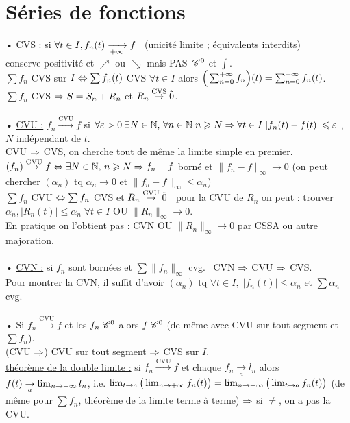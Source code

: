 \documentclass[12 pt]{book}
\begin{document}
\section*{Séries de fonctions}
• \underline{CVS :} si $\forall t\in I, f_n(t)\xrightarrow[+\infty]{} f$ \ (unicité limite ; équivalents interdits)\\
conserve positivité et $\nearrow$ ou $\searrow$ mais PAS $\, \mathscr{C}^0$ et $\int$.\\
$\sum f_n$ CVS sur $I \Leftrightarrow \sum f_n(t)$ CVS $\forall t\in I$ alors $\Big(\sum_{n=0}^{+\infty} f_n \Big)(t) = \sum_{n=0}^{+\infty} f_n(t)$.\\
$\sum f_n$ CVS $\Rightarrow S= S_n + R_n$ et $R_n \overset{\text{CVS}}{\to} \Tilde{0}$.\\
\text{}\\
• \underline{CVU :} $f_n \overset{\text{CVU}}{\to} f$ si $\forall\varepsilon>0 \; \exists N\in \mathbb{N},\, \forall n \in \mathbb{N} \; n\geqslant N \Rightarrow \forall t\in I\; |f_n(t)-f(t)|\leqslant\varepsilon$ , $N$ indépendant de $t$.\\
CVU $\Rightarrow$ CVS, on cherche tout de même la limite simple en premier.\\
$(f_n)\overset{\text{CVU}}{\to} f \Leftrightarrow \exists N\in\mathbb{N}, \, n\geqslant N \Rightarrow f_n -f$ borné et $\| f_n -f\|_\infty \to 0$ (on peut chercher $(\alpha_n)$ tq $\alpha_n \to 0$ et $\|f_n-f\|_\infty \leqslant\alpha_n$)\\
$\sum f_n$ CVU $\Leftrightarrow \sum f_n$ CVS et $R_n \overset{\text{CVU}}{\rightarrow}\Tilde{0}$ \ pour la CVU de $R_n$ on peut : trouver $\alpha_n, |R_n(t)|\leqslant \alpha_n \; \forall t\in I$ OU $\|R_n\|_\infty \to 0$.\\
En pratique on l'obtient pas : CVN OU $\|R_n\|_\infty \to 0$ par CSSA ou autre majoration.\\
\text{}\\
• \underline{CVN :} si $f_n$ sont bornées et $\sum \| f_n\|_\infty$ cvg. \ CVN $\Rightarrow$ CVU $\Rightarrow$ CVS.\\
Pour montrer la CVN, il suffit d'avoir $(\alpha_n)$ tq $\forall t\in I, \; |f_n(t)|\leqslant \alpha_n$ et $\sum\alpha_n$ cvg.\\
\text{}\\
• Si $f_n\overset{\text{CVU}}{\to}f$ et les $f_n \; \mathscr{C}^0$ alors $f \; \mathscr{C}^0$ (de même avec CVU sur tout segment et $\sum f_n$).\\
(CVU $\Rightarrow$) CVU sur tout segment $\Rightarrow$ CVS sur $I$.\\
\underline{théorème de la double limite :} si $f_n\overset{\text{CVU}}{\to} f$ et chaque $f_n\underset{a}{\to} l_n$ alors $f(t)\underset{a}{\to} \lim_{n\to +\infty} l_n$, i.e. $\lim_{t\to a}\big(\lim_{n\to +\infty} f_n(t)\big) = \lim_{n\to +\infty} \big(\lim_{t\to a} f_n(t)\big)$ \; (de même pour $\sum f_n$, théorème de la limite terme à terme) $\Rightarrow$ si $\neq$, on a pas la CVU.\\
\end{document}
